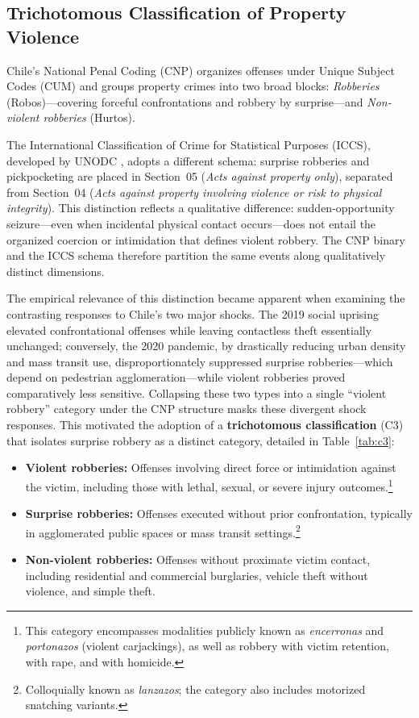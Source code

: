 \documentclass[pdflatex,sn-basic]{sn-jnl}
\begin{document}
\subsection{Trichotomous Classification of Property Violence}
\label{sub:clasificacion}

Chile's National Penal Coding (CNP) organizes offenses under Unique Subject Codes (CUM) and groups property crimes into two broad blocks: \textit{Robberies} (Robos)---covering forceful confrontations and robbery by surprise---and \textit{Non-violent robberies} (Hurtos).

The International Classification of Crime for Statistical Purposes (ICCS), developed by UNODC \citep{unodc2015iccs}, adopts a different schema: surprise robberies and pickpocketing are placed in Section~05 (\textit{Acts against property only}), separated from Section~04 (\textit{Acts against property involving violence or risk to physical integrity}). This distinction reflects a qualitative difference: sudden-opportunity seizure---even when incidental physical contact occurs---does not entail the organized coercion or intimidation that defines violent robbery. The CNP binary and the ICCS schema therefore partition the same events along qualitatively distinct dimensions.

The empirical relevance of this distinction became apparent when examining the contrasting responses to Chile's two major shocks. The 2019 social uprising elevated confrontational offenses while leaving contactless theft essentially unchanged; conversely, the 2020 pandemic, by drastically reducing urban density and mass transit use, disproportionately suppressed surprise robberies---which depend on pedestrian agglomeration---while violent robberies proved comparatively less sensitive. Collapsing these two types into a single ``violent robbery'' category under the CNP structure masks these divergent shock responses. This motivated the adoption of a \textbf{trichotomous classification} (C3) that isolates surprise robbery as a distinct category, detailed in Table~\ref{tab:c3}:

\begin{itemize}
  \item \textbf{Violent robberies:} Offenses involving direct force or intimidation against the victim, including those with lethal, sexual, or severe injury outcomes.\footnote{This category encompasses modalities publicly known as \textit{encerronas} and \textit{portonazos} (violent carjackings), as well as robbery with victim retention, with rape, and with homicide.}
  \item \textbf{Surprise robberies:} Offenses executed without prior confrontation, typically in agglomerated public spaces or mass transit settings.\footnote{Colloquially known as \textit{lanzazos}; the category also includes motorized snatching variants.}
  \item \textbf{Non-violent robberies:} Offenses without proximate victim contact, including residential and commercial burglaries, vehicle theft without violence, and simple theft.
\end{itemize}
\end{document}
